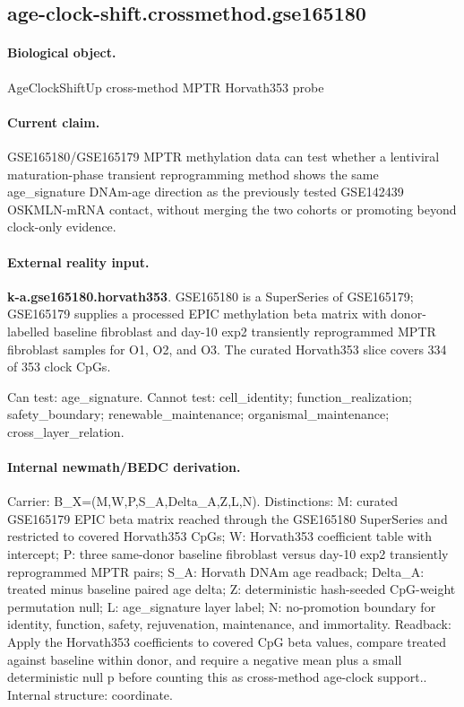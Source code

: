 \subsection{age-clock-shift.crossmethod.gse165180}

\paragraph{Biological object.} AgeClockShiftUp cross-method MPTR Horvath353 probe

\paragraph{Current claim.} GSE165180/GSE165179 MPTR methylation data can test whether a lentiviral maturation-phase transient reprogramming method shows the same age\_signature DNAm-age direction as the previously tested GSE142439 OSKMLN-mRNA contact, without merging the two cohorts or promoting beyond clock-only evidence.

\paragraph{External reality input.}
\textbf{k-a.gse165180.horvath353}. GSE165180 is a SuperSeries of GSE165179; GSE165179 supplies a processed EPIC methylation beta matrix with donor-labelled baseline fibroblast and day-10 exp2 transiently reprogrammed MPTR fibroblast samples for O1, O2, and O3. The curated Horvath353 slice covers 334 of 353 clock CpGs.

Can test: age\_signature. Cannot test: cell\_identity; function\_realization; safety\_boundary; renewable\_maintenance; organismal\_maintenance; cross\_layer\_relation.

\paragraph{Internal newmath/BEDC derivation.} Carrier: B\_X=(M,W,P,S\_A,Delta\_A,Z,L,N). Distinctions: M: curated GSE165179 EPIC beta matrix reached through the GSE165180 SuperSeries and restricted to covered Horvath353 CpGs; W: Horvath353 coefficient table with intercept; P: three same-donor baseline fibroblast versus day-10 exp2 transiently reprogrammed MPTR pairs; S\_A: Horvath DNAm age readback; Delta\_A: treated minus baseline paired age delta; Z: deterministic hash-seeded CpG-weight permutation null; L: age\_signature layer label; N: no-promotion boundary for identity, function, safety, rejuvenation, maintenance, and immortality. Readback: Apply the Horvath353 coefficients to covered CpG beta values, compare treated against baseline within donor, and require a negative mean plus a small deterministic null p before counting this as cross-method age-clock support.. Internal structure: coordinate.

